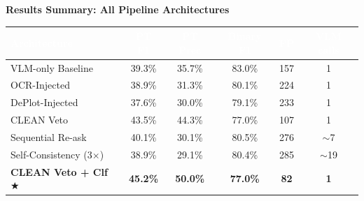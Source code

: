 \documentclass[border=8pt]{standalone}
\begin{document}
{\large\bfseries\color{dblue} Results Summary: All Pipeline Architectures}

\vspace{6pt}

\renewcommand{\arraystretch}{1.4}
\begin{tabular}{l c c c c c}
\toprule
\rowcolor{dblue}
\textcolor{white}{\bfseries Architecture} &
\textcolor{white}{\bfseries PT F1} &
\textcolor{white}{\bfseries PT Prec} &
\textcolor{white}{\bfseries Binary F1} &
\textcolor{white}{\bfseries FP} &
\textcolor{white}{\bfseries VLM calls} \\
\midrule
\rowcolor{lblue}
VLM-only Baseline & 39.3\% & 35.7\% & 83.0\% & 157 & 1 \\
\rowcolor{lred}
\textcolor{dred}{OCR-Injected} & \textcolor{dred}{38.9\%} & \textcolor{dred}{31.3\%} & \textcolor{dred}{80.1\%} & \textcolor{dred}{224} & \textcolor{dred}{1} \\
\rowcolor{lred}
\textcolor{dred}{DePlot-Injected} & \textcolor{dred}{37.6\%} & \textcolor{dred}{30.0\%} & \textcolor{dred}{79.1\%} & \textcolor{dred}{233} & \textcolor{dred}{1} \\
\rowcolor{lgreen}
CLEAN Veto & 43.5\% & 44.3\% & 77.0\% & 107 & 1 \\
\rowcolor{lblue}
Sequential Re-ask & 40.1\% & 30.1\% & 80.5\% & 276 & $\sim$7 \\
\rowcolor{lgray}
Self-Consistency (3$\times$) & 38.9\% & 29.1\% & 80.4\% & 285 & $\sim$19 \\
\rowcolor{lgreen}
\textcolor{dgreen}{\bfseries CLEAN Veto + Clf $\bigstar$} & \textcolor{dgreen}{\bfseries 45.2\%} & \textcolor{dgreen}{\bfseries 50.0\%} & \textcolor{dgreen}{\bfseries 77.0\%} & \textcolor{dgreen}{\bfseries 82} & \textcolor{dgreen}{\bfseries 1} \\
\bottomrule
\end{tabular}
\end{document}
